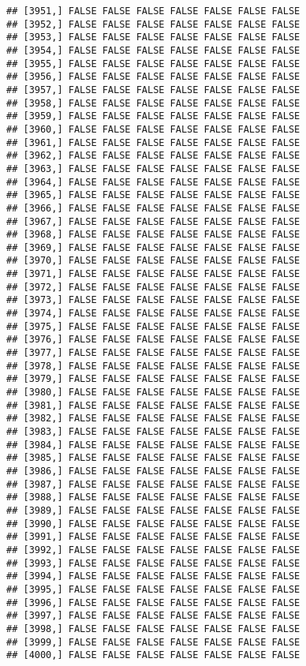 \documentclass[
]{article}
\begin{document}
\begin{verbatim}
## [3951,] FALSE FALSE FALSE FALSE FALSE FALSE FALSE
## [3952,] FALSE FALSE FALSE FALSE FALSE FALSE FALSE
## [3953,] FALSE FALSE FALSE FALSE FALSE FALSE FALSE
## [3954,] FALSE FALSE FALSE FALSE FALSE FALSE FALSE
## [3955,] FALSE FALSE FALSE FALSE FALSE FALSE FALSE
## [3956,] FALSE FALSE FALSE FALSE FALSE FALSE FALSE
## [3957,] FALSE FALSE FALSE FALSE FALSE FALSE FALSE
## [3958,] FALSE FALSE FALSE FALSE FALSE FALSE FALSE
## [3959,] FALSE FALSE FALSE FALSE FALSE FALSE FALSE
## [3960,] FALSE FALSE FALSE FALSE FALSE FALSE FALSE
## [3961,] FALSE FALSE FALSE FALSE FALSE FALSE FALSE
## [3962,] FALSE FALSE FALSE FALSE FALSE FALSE FALSE
## [3963,] FALSE FALSE FALSE FALSE FALSE FALSE FALSE
## [3964,] FALSE FALSE FALSE FALSE FALSE FALSE FALSE
## [3965,] FALSE FALSE FALSE FALSE FALSE FALSE FALSE
## [3966,] FALSE FALSE FALSE FALSE FALSE FALSE FALSE
## [3967,] FALSE FALSE FALSE FALSE FALSE FALSE FALSE
## [3968,] FALSE FALSE FALSE FALSE FALSE FALSE FALSE
## [3969,] FALSE FALSE FALSE FALSE FALSE FALSE FALSE
## [3970,] FALSE FALSE FALSE FALSE FALSE FALSE FALSE
## [3971,] FALSE FALSE FALSE FALSE FALSE FALSE FALSE
## [3972,] FALSE FALSE FALSE FALSE FALSE FALSE FALSE
## [3973,] FALSE FALSE FALSE FALSE FALSE FALSE FALSE
## [3974,] FALSE FALSE FALSE FALSE FALSE FALSE FALSE
## [3975,] FALSE FALSE FALSE FALSE FALSE FALSE FALSE
## [3976,] FALSE FALSE FALSE FALSE FALSE FALSE FALSE
## [3977,] FALSE FALSE FALSE FALSE FALSE FALSE FALSE
## [3978,] FALSE FALSE FALSE FALSE FALSE FALSE FALSE
## [3979,] FALSE FALSE FALSE FALSE FALSE FALSE FALSE
## [3980,] FALSE FALSE FALSE FALSE FALSE FALSE FALSE
## [3981,] FALSE FALSE FALSE FALSE FALSE FALSE FALSE
## [3982,] FALSE FALSE FALSE FALSE FALSE FALSE FALSE
## [3983,] FALSE FALSE FALSE FALSE FALSE FALSE FALSE
## [3984,] FALSE FALSE FALSE FALSE FALSE FALSE FALSE
## [3985,] FALSE FALSE FALSE FALSE FALSE FALSE FALSE
## [3986,] FALSE FALSE FALSE FALSE FALSE FALSE FALSE
## [3987,] FALSE FALSE FALSE FALSE FALSE FALSE FALSE
## [3988,] FALSE FALSE FALSE FALSE FALSE FALSE FALSE
## [3989,] FALSE FALSE FALSE FALSE FALSE FALSE FALSE
## [3990,] FALSE FALSE FALSE FALSE FALSE FALSE FALSE
## [3991,] FALSE FALSE FALSE FALSE FALSE FALSE FALSE
## [3992,] FALSE FALSE FALSE FALSE FALSE FALSE FALSE
## [3993,] FALSE FALSE FALSE FALSE FALSE FALSE FALSE
## [3994,] FALSE FALSE FALSE FALSE FALSE FALSE FALSE
## [3995,] FALSE FALSE FALSE FALSE FALSE FALSE FALSE
## [3996,] FALSE FALSE FALSE FALSE FALSE FALSE FALSE
## [3997,] FALSE FALSE FALSE FALSE FALSE FALSE FALSE
## [3998,] FALSE FALSE FALSE FALSE FALSE FALSE FALSE
## [3999,] FALSE FALSE FALSE FALSE FALSE FALSE FALSE
## [4000,] FALSE FALSE FALSE FALSE FALSE FALSE FALSE

\end{verbatim}
\end{document}

